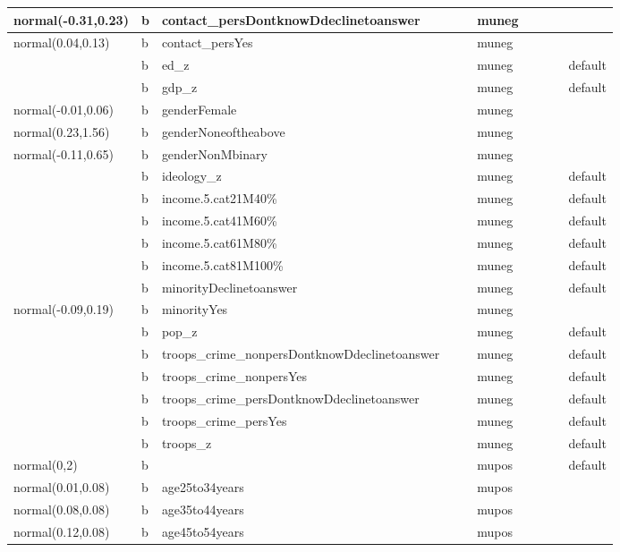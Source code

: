 \documentclass[
]{book}
\theoremstyle{definition}
\theoremstyle{definition}
\theoremstyle{definition}
\theoremstyle{definition}
\theoremstyle{remark}
\begin{document}
\begin{table}
\begin{tabular}[t]{l|l|l|l|l|l|l|l|l|l}
\hline
normal(-0.31,0.23) & b & contact\_persDontknowDdeclinetoanswer &  &  & muneg &  &  &  & \\
\hline
normal(0.04,0.13) & b & contact\_persYes &  &  & muneg &  &  &  & \\
\hline
 & b & ed\_z &  &  & muneg &  &  &  & default\\
\hline
 & b & gdp\_z &  &  & muneg &  &  &  & default\\
\hline
normal(-0.01,0.06) & b & genderFemale &  &  & muneg &  &  &  & \\
\hline
normal(0.23,1.56) & b & genderNoneoftheabove &  &  & muneg &  &  &  & \\
\hline
normal(-0.11,0.65) & b & genderNonMbinary &  &  & muneg &  &  &  & \\
\hline
 & b & ideology\_z &  &  & muneg &  &  &  & default\\
\hline
 & b & income.5.cat21M40\% &  &  & muneg &  &  &  & default\\
\hline
 & b & income.5.cat41M60\% &  &  & muneg &  &  &  & default\\
\hline
 & b & income.5.cat61M80\% &  &  & muneg &  &  &  & default\\
\hline
 & b & income.5.cat81M100\% &  &  & muneg &  &  &  & default\\
\hline
 & b & minorityDeclinetoanswer &  &  & muneg &  &  &  & default\\
\hline
normal(-0.09,0.19) & b & minorityYes &  &  & muneg &  &  &  & \\
\hline
 & b & pop\_z &  &  & muneg &  &  &  & default\\
\hline
 & b & troops\_crime\_nonpersDontknowDdeclinetoanswer &  &  & muneg &  &  &  & default\\
\hline
 & b & troops\_crime\_nonpersYes &  &  & muneg &  &  &  & default\\
\hline
 & b & troops\_crime\_persDontknowDdeclinetoanswer &  &  & muneg &  &  &  & default\\
\hline
 & b & troops\_crime\_persYes &  &  & muneg &  &  &  & default\\
\hline
 & b & troops\_z &  &  & muneg &  &  &  & default\\
\hline
normal(0,2) & b &  &  &  & mupos &  &  &  & default\\
\hline
normal(0.01,0.08) & b & age25to34years &  &  & mupos &  &  &  & \\
\hline
normal(0.08,0.08) & b & age35to44years &  &  & mupos &  &  &  & \\
\hline
normal(0.12,0.08) & b & age45to54years &  &  & mupos &  &  &  & \\

\end{tabular}
\end{table}
\end{document}
